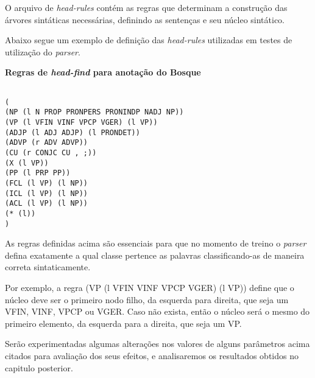 O arquivo de \emph{head-rules} contém as regras que determinam a construção das árvores sintáticas necessárias, definindo as sentenças e seu núcleo sintático.

Abaixo segue um exemplo de definição das \emph{head-rules} utilizadas em testes de utilização do \emph{parser}.

\textbf{Regras de \emph{head-find} para anotação do Bosque}

\scriptsize

\begin{verbatim}

(
(NP (l N PROP PRONPERS PRONINDP NADJ NP))
(VP (l VFIN VINF VPCP VGER) (l VP))
(ADJP (l ADJ ADJP) (l PRONDET))
(ADVP (r ADV ADVP))
(CU (r CONJC CU , ;))
(X (l VP))
(PP (l PRP PP))
(FCL (l VP) (l NP))
(ICL (l VP) (l NP))
(ACL (l VP) (l NP))
(* (l))
)
\end{verbatim}

\normalsize

As regras definidas acima são essenciais para que no momento de treino o \emph{parser} defina exatamente a qual classe pertence as palavras classificando-as de maneira correta sintaticamente.

Por exemplo, a regra (VP (l VFIN VINF VPCP VGER) (l VP)) define que o núcleo deve ser o primeiro nodo filho, da esquerda para direita, que seja um VFIN, VINF, VPCP ou VGER. Caso não exista, então o núcleo será o mesmo do primeiro elemento, da esquerda para a direita, que seja um VP.

Serão experimentadas algumas alterações nos valores de alguns parâmetros acima citados para avaliação dos seus efeitos, e analisaremos os resultados obtidos no capitulo posterior.

